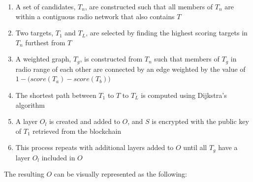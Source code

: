 \documentclass[10pt, nonatbib, nocopyrightspace, reprint]{sigplanconf}
\begin{document}
\begin{enumerate}
  \item A set of candidates, $T_n$, are constructed such that all members of $T_n$ are within a contiguous radio network that also contains $T$
  \item Two targets, $T_1$ and $T_L$, are selected by finding the highest scoring targets in $T_n$ furthest from $T$
  \item A weighted graph, $T_g$, is constructed from $T_n$ such that members of $T_g$ in radio range of each other are connected by an edge weighted by the value of \(1 - \Big({score(T_a) - score(T_b)}\Big)\)
  \item The shortest path between $T_1$ to $T$ to $T_L$ is computed using Dijkstra's algorithm\cite{dijkstra}
  \item A layer $O_l$ is created and added to $O$, and $S$ is encrypted with the public key of $T_1$ retrieved from the blockchain  
  \item This process repeats with additional layers added to $O$ until all $T_g$ have a layer $O_l$ included in $O$
\end{enumerate}

The resulting $O$ can be visually represented as the following:
\end{document}
